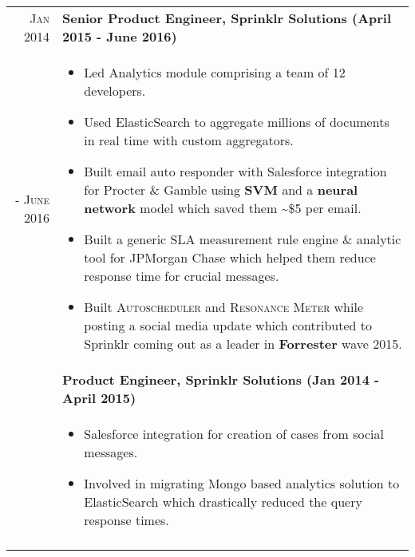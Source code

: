 \documentclass[a4paper,10pt]{article}
\begin{document}
\begin{tabular}{r|p{16cm}}
 \textsc{Jan 2014 } & \textbf{Senior Product Engineer, Sprinklr Solutions (April 2015 - June 2016)} \\\textsc{- June 2016}&
 \begin{itemize}[noitemsep]
 \item Led Analytics module comprising a team of 12 developers.
 \item Used ElasticSearch to aggregate millions of documents in real time with custom aggregators.
 \item Built email auto responder with Salesforce integration for Procter \& Gamble using \textbf{SVM} and a \textbf{neural network} model which saved them \textasciitilde\$5 per email.
 \item Built a generic SLA measurement rule engine \& analytic tool for JPMorgan Chase which helped them reduce response time for crucial messages.
 \item Built \textsc{Autoscheduler} and \textsc{Resonance Meter} while posting a social media update which contributed to Sprinklr coming out as a leader in \textbf{Forrester} wave 2015.
 \end{itemize}
 \\&
 \textbf{Product Engineer, Sprinklr Solutions (Jan 2014 - April 2015)} \\&
 \begin{itemize}[noitemsep]
 \item Salesforce integration for creation of cases from social messages.
 \item Involved in migrating Mongo based analytics solution to ElasticSearch which drastically reduced the query response times.
 \end{itemize}
 \\\multicolumn{2}{c}{} \\
\end{tabular}


\end{document}
